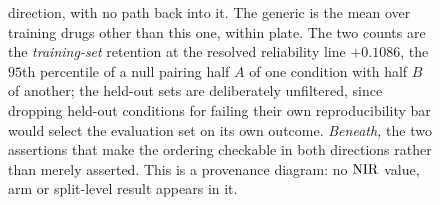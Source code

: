 \begin{figure}[htbp]
\begin{fullwidth}
{direction, with no path back into it. The generic is the mean over training
drugs other than this one, within plate. The two counts are the
\emph{training-set} retention at the resolved reliability line $+0.1086$, the
$95$th percentile of a null pairing half $A$ of one condition with half $B$ of
another; the held-out sets are deliberately unfiltered, since dropping held-out
conditions for failing their own reproducibility bar would select the
evaluation set on its own outcome. \emph{Beneath,} the two assertions that make
the ordering checkable in both directions rather than merely asserted. This is
a provenance diagram: no $\textrm{NIR}$ value, arm or split-level result appears in
it.}
\label{fig:circularity}
\end{fullwidth}
\end{figure}
